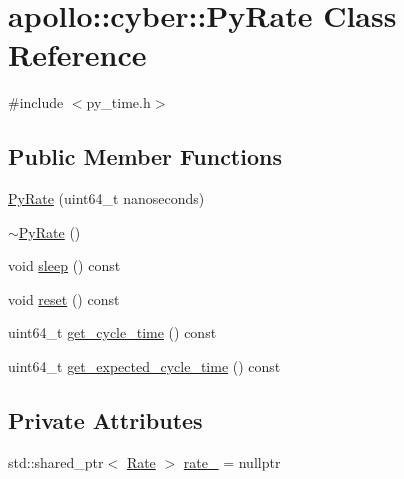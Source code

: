 \hypertarget{classapollo_1_1cyber_1_1PyRate}{\section{apollo\-:\-:cyber\-:\-:Py\-Rate Class Reference}
\label{classapollo_1_1cyber_1_1PyRate}
}


{\ttfamily \#include $<$py\-\_\-time.\-h$>$}

\subsection*{Public Member Functions}
\begin{DoxyCompactItemize}
\item 
\hyperlink{classapollo_1_1cyber_1_1PyRate_af66bcbcd8ad149f4805985102e298ff2}{Py\-Rate} (uint64\-\_\-t nanoseconds)
\item 
\hyperlink{classapollo_1_1cyber_1_1PyRate_ad702688e546c2bae4b4bc3c818b55c4e}{$\sim$\-Py\-Rate} ()
\item 
void \hyperlink{classapollo_1_1cyber_1_1PyRate_a667bd78df8c1dd9f14e0820183ea0e25}{sleep} () const 
\item 
void \hyperlink{classapollo_1_1cyber_1_1PyRate_a2b934705deb6c0b5f3d7ca32ef197a4c}{reset} () const 
\item 
uint64\-\_\-t \hyperlink{classapollo_1_1cyber_1_1PyRate_a6021d949f918ae5b4dc65ac8b3e8403e}{get\-\_\-cycle\-\_\-time} () const 
\item 
uint64\-\_\-t \hyperlink{classapollo_1_1cyber_1_1PyRate_af9b1a9e7dc26e7bfd308bf6101e0f8c2}{get\-\_\-expected\-\_\-cycle\-\_\-time} () const 
\end{DoxyCompactItemize}
\subsection*{Private Attributes}
\begin{DoxyCompactItemize}
\item 
std\-::shared\-\_\-ptr$<$ \hyperlink{classapollo_1_1cyber_1_1Rate}{Rate} $>$ \hyperlink{classapollo_1_1cyber_1_1PyRate_a6e4b617e790a9c30c514970232dae587}{rate\-\_\-} = nullptr
\end{DoxyCompactItemize}


